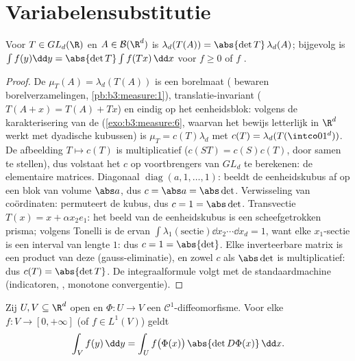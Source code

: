 \section{Variabelensubstitutie}

\begin{theorem}
\label{thm:b3:product:linearchange}
Voor $T \in GL_d(\R)$ en $A \in \mathcal B(\R^d)$ is
$\lambda_d(T(A)) = \abs{\det T}\,\lambda_d(A)$; bijgevolg is $\int
f(y)\dd y = \abs{\det T}\int f(Tx)\,\dd x$ voor $f \geq 0$ of $f$
.
\end{theorem}

\begin{proof}
De  $\mu_T(A) = \lambda_d(T(A))$ is een borelmaat
( bewaren borelverzamelingen,
\cref{pb:b3:measure:1}), translatie-invariant ($T(A + x) = T(A) +
Tx$) en eindig op het eenheidsblok: volgens de karakterisering van
de  (\cref{exo:b3:measure:6}, waarvan het bewijs
letterlijk in $\R^d$ werkt met dyadische kubussen) is $\mu_T =
c(T)\lambda_d$ met $c(T) = \lambda_d(T(\intco01^d))$. De
afbeelding $T \mapsto c(T)$ is multiplicatief ($c(ST) = c(S)c(T)$,
door samen te stellen), dus volstaat het $c$ op voortbrengers van
$GL_d$ te berekenen: de elementaire matrices. Diagonaal
$\operatorname{diag}(a, 1, \dots, 1)$: beeldt de eenheidskubus af
op een blok van volume $\abs a$, dus $c = \abs a = \abs\det$.
Verwisseling van coördinaten: permuteert de kubus, dus $c = 1 =
\abs\det$. Transvectie $T(x) = x + \alpha x_2e_1$: het beeld van
de eenheidskubus is een scheefgetrokken prisma; volgens Tonelli is
de  ervan $\int\lambda_1(\text{sectie})\dd x_2 \cdots \dd
x_d = 1$, want elke $x_1$-sectie is een interval van lengte $1$:
dus $c = 1 = \abs{\det}$. Elke inverteerbare matrix is een product
van deze (gauss-eliminatie), en zowel $c$ als $\abs\det$ is
multiplicatief: dus $c(T) = \abs{\det T}$. De integraalformule
volgt met de standaardmachine (indicatoren, ,
monotone convergentie).
\end{proof}

\begin{theorem}[Variabelensubstitutie]\label{thm:b3:product:changeofvar}
Zij $U, V \subseteq \R^d$ open en $\Phi \colon U \to V$ een
$\mathcal C^1$-diffeomorfisme. Voor elke  $f \colon V \to
[0, +\infty]$ (of $f \in L^1(V)$) geldt
\[
\int_V f(y)\,\dd y = \int_U
f\bigl(\Phi(x)\bigr)\,\abs{\det D\Phi(x)}\,\dd x .
\]
\end{theorem}


